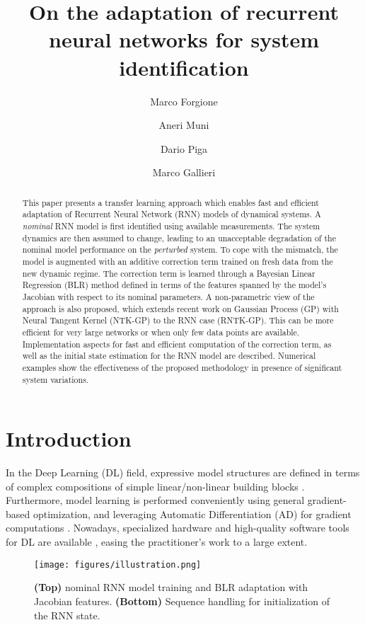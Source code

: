 \documentclass{article}
\title{On the adaptation of recurrent neural networks for system identification}
\author[1]{Marco Forgione}
\author[2]{Aneri Muni}
\author[1]{Dario Piga}
\author[2]{Marco Gallieri}
\affil[1]{Dalle Molle Institute for Artificial Intelligence, IDSIA USI-SUPSI, Via la Santa 1, CH-6962 Lugano-Viganello, Switzerland.}
\affil[2]{NNAISENSE SA, Piazza Molino Nuovo 17, CH-6900 Lugano, Switzerland}
\begin{document}
\maketitle


\begin{abstract}                          %

This paper presents a transfer learning approach which enables fast and efficient adaptation of Recurrent Neural Network (RNN) models of dynamical systems. A \emph{nominal} RNN model is first identified using available measurements. The system dynamics are then assumed to change, leading to an unacceptable degradation of the nominal model performance  on the \emph{perturbed} system. To cope with the  mismatch, the model is augmented  with an additive correction term trained on fresh data from the new dynamic regime. The correction term is learned through a Bayesian Linear Regression (BLR) method defined in terms of the features spanned by the model's Jacobian with respect to its nominal parameters.
A non-parametric view of the approach is also proposed, which extends recent work on Gaussian Process (GP) with Neural Tangent Kernel (NTK-GP) to the RNN case (RNTK-GP). This can be more efficient for very large networks or when only few data points are available. Implementation aspects for fast and efficient computation of the correction term, as well as the initial state estimation for the RNN model are described. Numerical examples show the effectiveness of the proposed methodology in presence of significant system variations. 
\end{abstract}


\section{Introduction}
\label{sec:intro}
In the Deep Learning (DL) field, expressive model structures are defined in terms of 
complex compositions of simple linear/non-linear building blocks \cite{schmidhuber2015deep}. Furthermore, model learning is performed conveniently using general gradient-based optimization, and leveraging  Automatic Differentiation (AD) for gradient computations \cite{baydin2017automatic}. Nowadays, specialized hardware and 
high-quality software tools for DL are available \cite{paszke2017automatic}, easing the practitioner's work to a large extent.

\begin{figure}[bt]
 \centering
 \texttt{[image: figures/illustration.png]}
 \caption{\textbf{(Top)} nominal RNN model training and BLR adaptation with Jacobian features. \textbf{(Bottom)} Sequence handling for initialization of the RNN state.} 
 \label{fig:RNN-overview}
\end{figure}
\end{document}
